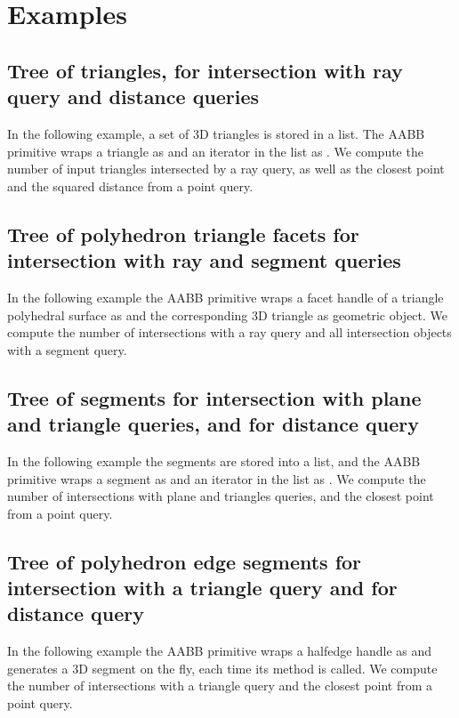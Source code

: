 \section{Examples}
\label{AABB_tree_section_examples}

\subsection{Tree of triangles, for intersection with ray query and distance queries}
In the following example, a set of 3D triangles is stored in a list. The AABB primitive wraps a triangle as  and an iterator in the list as . We compute the number of input triangles intersected by a ray query, as well as the closest point and the squared distance from a point query.

\subsection{Tree of polyhedron triangle facets for intersection with ray and segment queries}
In the following example the AABB primitive wraps a facet handle of a triangle polyhedral surface as  and the corresponding 3D triangle as geometric object. We compute the number of intersections with a ray query and all intersection objects with a segment query. 

\subsection{Tree of segments for intersection with plane and triangle queries, and for distance query}
In the following example the segments are stored into a list, and the AABB primitive wraps a segment as  and an iterator in the list as . We compute the number of intersections with plane and triangles queries, and the closest point from a point query. 

\subsection{Tree of polyhedron edge segments for intersection with a triangle query and for distance query}
In the following example the AABB primitive wraps a halfedge handle as  and generates a 3D segment on the fly, each time its method  is called. We compute the number of intersections with a triangle query and the closest point from a point query. 
